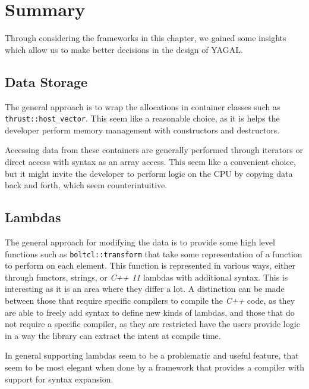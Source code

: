 \section{Summary}
Through considering the frameworks in this chapter, we gained some insights which allow us to make better decisions in the design of YAGAL.

\subsection{Data Storage}
The general approach is to wrap the allocations in container classes such as \texttt{thrust::host\_vector}. This seem like a reasonable choice, as it is helps the developer perform memory management with constructors and destructors.

Accessing data from these containers are generally performed through iterators or direct access with syntax as an array access. This seem like a convenient choice, but it might invite the developer to perform logic on the CPU by copying data back and forth, which seem counterintuitive.

\subsection{Lambdas}
The general approach for modifying the data is to provide some high level functions such as \texttt{boltcl::transform} that take some representation of a function to perform on each element. This function is represented in various ways, either through functors, strings, or \textit{C++ 11} lambdas with additional syntax. This is interesting as it is an area where they differ a lot. A distinction can be made between those that require specific compilers to compile the \textit{C++} code, as they are able to freely add syntax to define new kinds of lambdas, and those that do not require a specific compiler, as they are restricted have the users provide logic in a way the library can extract the intent at compile time.

In general supporting lambdas seem to be a problematic and useful feature, that seem to be most elegant when done by a framework that provides a compiler with support for syntax expansion.